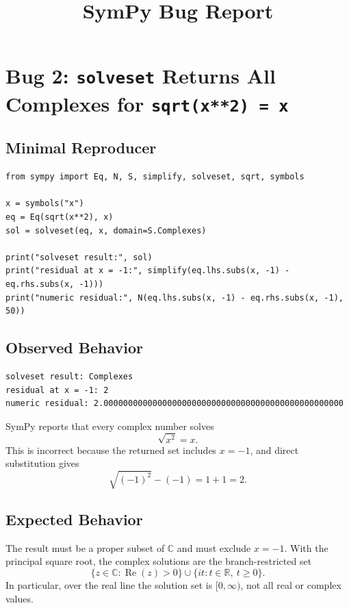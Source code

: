 \documentclass[11pt]{article}
\title{SymPy Bug Report}
\author{}
\date{}
\begin{document}
\maketitle

\section{Bug 2: \texttt{solveset} Returns All Complexes for \texttt{sqrt(x**2) = x}}

\subsection{Minimal Reproducer}

\medskip

\begin{lstlisting}[style=bugpython]
from sympy import Eq, N, S, simplify, solveset, sqrt, symbols

x = symbols("x")
eq = Eq(sqrt(x**2), x)
sol = solveset(eq, x, domain=S.Complexes)

print("solveset result:", sol)
print("residual at x = -1:", simplify(eq.lhs.subs(x, -1) - eq.rhs.subs(x, -1)))
print("numeric residual:", N(eq.lhs.subs(x, -1) - eq.rhs.subs(x, -1), 50))
\end{lstlisting}

\subsection{Observed Behavior}

\medskip

\begin{lstlisting}[style=bugpython]
solveset result: Complexes
residual at x = -1: 2
numeric residual: 2.0000000000000000000000000000000000000000000000000
\end{lstlisting}

SymPy reports that every complex number solves
\[
    \sqrt{x^2} = x.
\]
This is incorrect because the returned set includes \(x=-1\), and direct substitution gives
\[
    \sqrt{(-1)^2} - (-1) = 1 + 1 = 2.
\]

\subsection{Expected Behavior}

The result must be a proper subset of \(\mathbb{C}\) and must exclude \(x=-1\). With the principal square root, the complex solutions are the branch-restricted set
\[
    \{z \in \mathbb{C} : \operatorname{Re}(z) > 0\}
    \cup
    \{it : t \in \mathbb{R},\ t \ge 0\}.
\]
In particular, over the real line the solution set is \([0,\infty)\), not all real or complex values.
\end{document}
